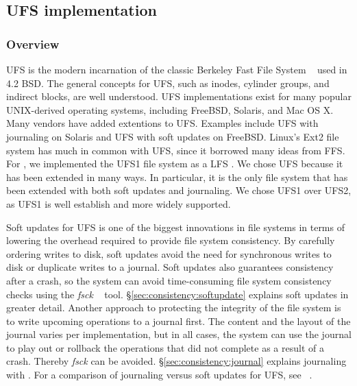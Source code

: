 \subsection{UFS implementation}
\label{sec:modules:ufs}

\subsubsection {Overview}
UFS is the modern incarnation of the classic Berkeley Fast File System
~\cite{mckusick84fast} used in 4.2 BSD. The general concepts for UFS, such as
inodes, cylinder groups, and indirect blocks, are well understood. UFS
implementations exist for many popular UNIX-derived operating systems,
including FreeBSD, Solaris, and Mac OS X. Many vendors have added extentions
to UFS. Examples include UFS with journaling on Solaris and UFS with soft
updates on FreeBSD. Linux's Ext2 file system has much in common with UFS,
since it borrowed many ideas from FFS. For \Kudos, we implemented the UFS1
file system as a LFS \module. We chose UFS because it has been extended in
many ways. In particular, it is the only file system that has been extended
with both soft updates and journaling. We chose UFS1 over UFS2, as UFS1 is
well establish and more widely supported.

Soft updates for UFS is one of the biggest innovations in file systems
in terms of lowering the overhead required to provide file system
consistency. By carefully ordering writes to disk, soft updates avoid
the need for synchronous writes to disk or duplicate writes to a
journal. Soft updates also guarantees consistency after a crash, so
the system can avoid time-consuming file system consistency
checks using the \emph{fsck} ~\cite{mckusick94fsck} tool.
\S\ref{sec:consistency:softupdate} explains soft updates in
greater detail. Another approach to protecting the integrity of the
file system is to write upcoming operations to a journal first. The
content and the layout of the journal varies per implementation, but
in all cases, the system can use the journal to play out or rollback
the operations that did not complete as a result of a crash. Thereby
\emph{fsck} can be avoided. \S\ref{sec:consistency:journal} explains
journaling with \chdescs. For a comparison of journaling versus soft
updates for UFS, see ~\cite{seltzer00journaling}.


